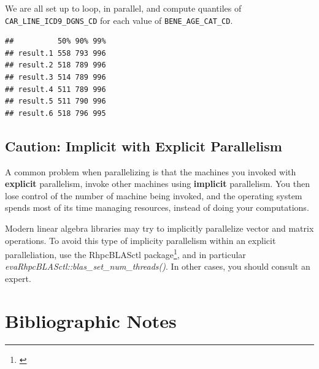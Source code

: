 \documentclass[]{book}
\newenvironment{Shaded}{\begin{snugshade}}{\end{snugshade}}
\newcommand{\DataTypeTok}[1]{\textcolor[rgb]{0.13,0.29,0.53}{#1}}
\newcommand{\KeywordTok}[1]{\textcolor[rgb]{0.13,0.29,0.53}{\textbf{#1}}}
\newcommand{\NormalTok}[1]{#1}
\newcommand{\OperatorTok}[1]{\textcolor[rgb]{0.81,0.36,0.00}{\textbf{#1}}}
\newcommand{\StringTok}[1]{\textcolor[rgb]{0.31,0.60,0.02}{#1}}
\renewcommand{\href}[2]{#2\footnote{\url{#1}}}
\theoremstyle{definition}
\theoremstyle{definition}
\theoremstyle{definition}
\theoremstyle{remark}
\begin{document}
We are all set up to loop, in parallel, and compute quantiles of \texttt{CAR\_LINE\_ICD9\_DGNS\_CD} for each value of \texttt{BENE\_AGE\_CAT\_CD}.

\begin{Shaded}
\end{Shaded}

\begin{verbatim}
##          50% 90% 99%
## result.1 558 793 996
## result.2 518 789 996
## result.3 514 789 996
## result.4 511 789 996
## result.5 511 790 996
## result.6 518 796 995
\end{verbatim}

\hypertarget{caution-implicit-with-explicit-parallelism}{%
\subsection{Caution: Implicit with Explicit Parallelism}\label{caution-implicit-with-explicit-parallelism}}

A common problem when parallelizing is that the machines you invoked with \textbf{explicit} parallelism, invoke other machines using \textbf{implicit} parallelism.
You then lose control of the number of machine being invoked, and the operating system spends most of its time managing resources, instead of doing your computations.

Modern linear algebra libraries may try to implicitly parallelize vector and matrix operations.
To avoid this type of implicity parallelism within an explicit paralleliation, use the \href{}{RhpcBLASctl package}, and in particular \emph{evaRhpcBLASctl::blas\_set\_num\_threads()}.
In other cases, you should consult an expert.

\hypertarget{bibliographic-notes-14}{%
\section{Bibliographic Notes}\label{bibliographic-notes-14}}
\end{document}
